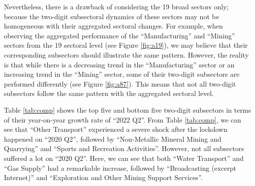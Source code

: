 \documentclass{monashthesis}
\begin{document}
Nevertheless, there is a drawback of considering the 19 broad sectors only; because the two-digit subsectoral dynamics of these sectors may not be homogeneous with their aggregated sectoral changes. For example, when observing the aggregated performance of the ``Manufacturing'' and ``Mining'' sectors from the 19 sectoral level (see Figure \ref{fig:a19}), we may believe that their corresponding subsectors should illustrate the same pattern. However, the reality is that while there is a decreasing trend in the ``Manufacturing'' sector or an increasing trend in the ``Mining'' sector, some of their two-digit subsectors are performed differently (see Figure \ref{fig:a87}). This means that not all two-digit subsectors follow the same pattern with the aggregated sectoral level.

Table \ref{tab:comp} shows the top five and bottom five two-digit subsectors in terms of their year-on-year growth rate of ``2022 Q2''. From Table \ref{tab:comp}, we can see that ``Other Transport'' experienced a severe shock after the lockdown happened on ``2020 Q2'', followed by ``Non-Metallic Mineral Mining and Quarrying'' and ``Sports and Recreation Activities''. However, not all subsectors suffered a lot on ``2020 Q2''. Here, we can see that both ``Water Transport'' and ``Gas Supply'' had a remarkable increase, followed by ``Broadcasting (excerpt Internet)'' and ``Exploration and Other Mining Support Services''.
\end{document}

